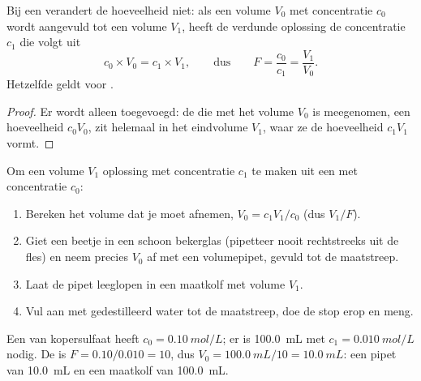\begin{proposition}\label{prop:g10:concentration-and-dilution:kept}
Bij een  verandert de hoeveelheid  niet: als een
volume $V_0$  met concentratie $c_0$ wordt aangevuld tot een
volume $V_1$, heeft de verdunde oplossing de concentratie $c_1$ die volgt
uit
\[
  c_0 \times V_0 = c_1 \times V_1,
  \qquad\text{dus}\qquad
  F = \frac{c_0}{c_1} = \frac{V_1}{V_0} .
\]
Hetzelfde geldt voor .
\end{proposition}

\begin{proof}
Er wordt alleen  toegevoegd: de  die met het
volume $V_0$ is meegenomen, een hoeveelheid $c_0 V_0$, zit helemaal in
het eindvolume $V_1$, waar ze de hoeveelheid $c_1 V_1$ vormt.
\end{proof}


\begin{method}\label{met:g10:concentration-and-dilution:diluting}
Om een volume $V_1$ oplossing met concentratie $c_1$ te maken uit een
 met concentratie $c_0$:
\begin{enumerate}
  \item Bereken het volume  dat je moet afnemen,
        $V_0 = c_1 V_1 / c_0$ (dus $V_1 / F$).
  \item Giet een beetje  in een schoon bekerglas (pipetteer
        nooit rechtstreeks uit de fles) en neem precies $V_0$ af met een
        volumepipet, gevuld tot de maatstreep.
  \item Laat de pipet leeglopen in een maatkolf met volume $V_1$.
  \item Vul aan met gedestilleerd water tot de maatstreep, doe de stop
        erop en meng.
\end{enumerate}
\end{method}

\begin{example}\label{ex:g10:concentration-and-dilution:tenfold}
Een  van kopersulfaat heeft $c_0 = \qty{0.10}{mol/L}$; er is
\qty{100.0}{mL} met $c_1 = \qty{0.010}{mol/L}$ nodig. De 
is $F = 0.10 / 0.010 = 10$, dus $V_0 = \qty{100.0}{mL} / 10 =
\qty{10.0}{mL}$: een pipet van \qty{10.0}{mL} en een maatkolf van
\qty{100.0}{mL}.
\end{example}

